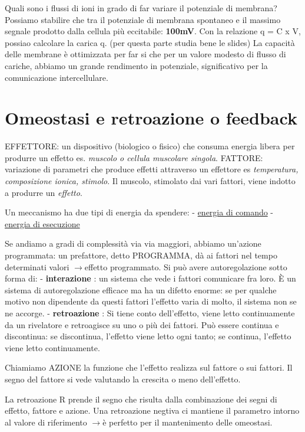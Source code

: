 \documentclass[a4paper,12pt]{article}
\newcommand{\lfreccia}{\ensuremath{\longrightarrow}}
\begin{document}
Quali sono i flussi di ioni in grado di far variare il potenziale di membrana?
Possiamo stabilire che tra il potenziale di membrana spontaneo e il massimo segnale prodotto dalla cellula più eccitabile: \textbf{100mV}.
Con la relazione q = C x V, possiao calcolare la carica q. (per questa parte studia bene le slides)
La capacità delle membrane è ottimizzata per far si che per un valore modesto di flusso di cariche, abbiamo un grande rendimento in potenziale, significativo per la comunicazione intercellulare.

\section{Omeostasi e retroazione o feedback}

EFFETTORE: un dispositivo (biologico o fisico) che consuma energia libera per produrre un effetto es. \emph{muscolo o cellula muscolare singola}.
FATTORE: variazione di parametri che produce effetti attraverso un effettore es \emph{temperatura, composizione ionica, stimolo}.
Il muscolo, stimolato dai vari fattori, viene indotto a produrre un \emph{effetto}. 

Un meccanismo ha due tipi di energia da spendere:
- \underline{energia di comando}
- \underline{energia di esecuzione}

Se andiamo a gradi di complessità via via maggiori, abbiamo un'azione programmata: un prefattore, detto PROGRAMMA, dà ai fattori nel tempo determinati valori \lfreccia effetto programmato.
Si può avere autoregolazione sotto forma di:
- \textbf{interazione} : un sistema che vede i fattori comunicare fra loro. È un sistema di autoregolazione efficace ma ha un difetto enorme: se per qualche motivo non dipendente da questi fattori l'effetto varia di molto, il sistema non se ne accorge. 
- \textbf{retroazione} :  Si tiene conto dell'effetto, viene letto continuamente da un rivelatore e retroagisce su uno o più dei fattori. Può essere continua e discontinua: se discontinua, l'effetto viene letto ogni tanto; se continua, l'effetto viene letto continuamente.

Chiamiamo AZIONE la funzione che l'effetto realizza sul fattore o sui fattori. Il segno del fattore si vede valutando la crescita o meno dell'effetto. 

La retroazione R prende il segno che risulta dalla combinazione dei segni di effetto, fattore e azione. Una retroazione negtiva ci mantiene il parametro intorno al valore di riferimento \lfreccia è perfetto per il mantenimento delle omeostasi.
\end{document}
